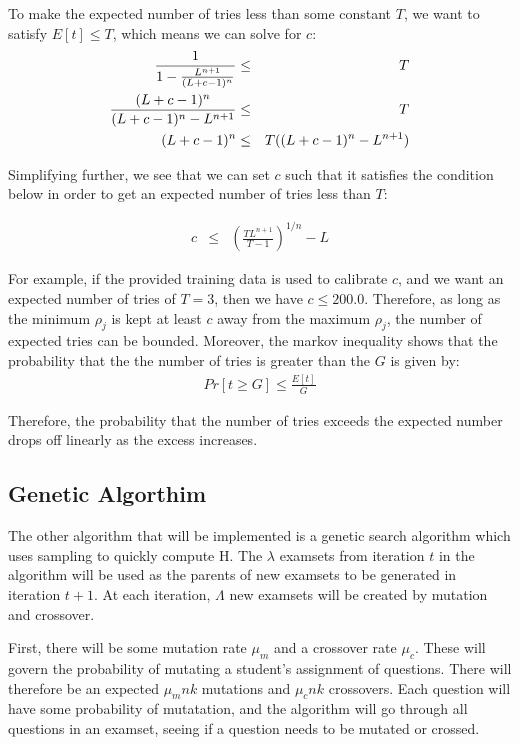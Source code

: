 \documentclass[psamsfonts]{amsart}
\begin{document}
To make the expected number of tries less than some constant $T$, we want to satisfy $E[t] \leq T$, which means we can solve for $c$:
\begin{eqnarray}
{{1} \over {1 - \frac{L^{n+1}}{(L+c-1)^n}}} &\leq& T \\
{{(L+c-1)^n} \over {(L+c-1)^n - L^{n+1}}} &\leq& T \\
(L+c-1)^n &\leq& T ((L+c-1)^n - L^{n+1}) 
\end{eqnarray}

Simplifying further, we see that we can set $c$ such that it satisfies the condition below in order to get an expected number of tries less than $T$:

\begin{eqnarray}
c &\leq& \left( \frac{T L^{n+1}}{T-1} \right)^{1/n} - L 
\end{eqnarray}

For example, if the provided training data is used to calibrate $c$, and we want an expected number of tries of $T = 3$, then we have $c \leq 200.0$. Therefore, as long as the minimum $\rho_j$ is kept at least $c$ away from the maximum $\rho_j$, the number of expected tries can be bounded. Moreover, the markov inequality shows that the probability that the the number of tries is greater than the $G$ is given by:
\begin{eqnarray}
Pr[t \geq G] \leq \frac{E[t]}{G}
\end{eqnarray}

Therefore, the probability that the number of tries exceeds the expected number drops off linearly as the excess increases.

\subsection{Genetic Algorthim}
 
The other algorithm that will be implemented is a genetic search algorithm which uses sampling to quickly compute $\mathrm{H}$. The $\lambda$ examsets from iteration $t$ in the algorithm will be used as the parents of new examsets to be generated in iteration $t+1$. At each iteration, $\Lambda$ new examsets will be created by mutation and crossover.

First, there will be some mutation rate $\mu_m$ and a crossover rate $\mu_c$. These will govern the probability of mutating a student's assignment of questions. There will therefore be an expected $\mu_m nk$ mutations and $\mu_c nk$ crossovers. Each question will have some probability of mutatation, and the algorithm will go through all questions in an examset, seeing if a question needs to be mutated or crossed. 
\end{document}
